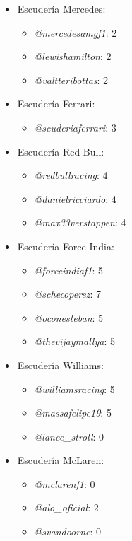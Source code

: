 \begin{itemize}
	\item Escudería Mercedes:
	\begin{itemize}
		\item \textit{@mercedesamgf1}: 2
		\item \textit{@lewishamilton}: 2
		\item \textit{@valtteribottas}: 2
	\end{itemize}

	\item Escudería Ferrari:
	\begin{itemize}
		\item \textit{@scuderiaferrari}: 3
	\end{itemize}

	\item Escudería Red Bull:
	\begin{itemize}
		\item \textit{@redbullracing}: 4
		\item \textit{@danielricciardo}: 4
		\item \textit{@max33verstappen}: 4
	\end{itemize}
	
	\item Escudería Force India:
	\begin{itemize}
		\item \textit{@forceindiaf1}: 5
		\item \textit{@schecoperez}: 7
		\item \textit{@oconesteban}: 5
		\item \textit{@thevijaymallya}: 5
	\end{itemize}

	\item Escudería Williams:
	\begin{itemize}
		\item \textit{@williamsracing}: 5
		\item \textit{@massafelipe19}: 5
		\item \textit{@lance\_stroll}: 0
	\end{itemize}

	\item Escudería McLaren:
	\begin{itemize}
		\item \textit{@mclarenf1}: 0
		\item \textit{@alo\_oficial}: 2
		\item \textit{@svandoorne}: 0
	\end{itemize}


\end{itemize}
